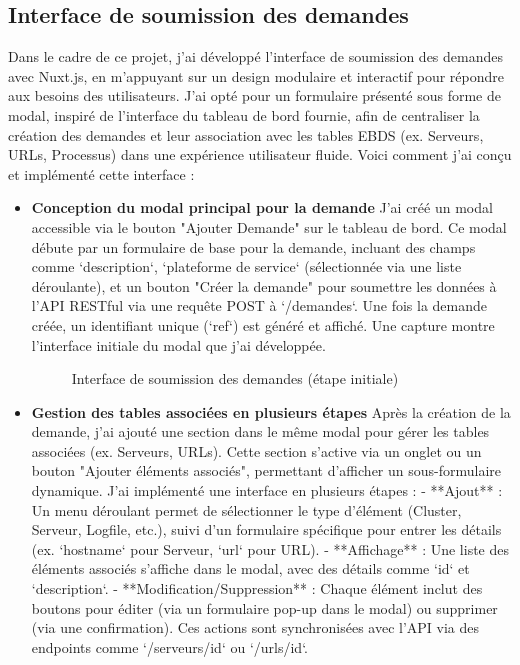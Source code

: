 \subsection{Interface de soumission des demandes}

Dans le cadre de ce projet, j’ai développé l’interface de soumission des demandes avec Nuxt.js, en m’appuyant sur un design modulaire et interactif pour répondre aux besoins des utilisateurs. J’ai opté pour un formulaire présenté sous forme de modal, inspiré de l’interface du tableau de bord fournie, afin de centraliser la création des demandes et leur association avec les tables EBDS (ex. Serveurs, URLs, Processus) dans une expérience utilisateur fluide. Voici comment j’ai conçu et implémenté cette interface :

\begin{itemize}
    \item \textbf{Conception du modal principal pour la demande}  
      J’ai créé un modal accessible via le bouton "Ajouter Demande" sur le tableau de bord. Ce modal débute par un formulaire de base pour la demande, incluant des champs comme `description`, `plateforme de service` (sélectionnée via une liste déroulante), et un bouton "Créer la demande" pour soumettre les données à l’API RESTful via une requête POST à `/demandes`. Une fois la demande créée, un identifiant unique (`ref`) est généré et affiché. Une capture montre l’interface initiale du modal que j’ai développée.
      
      \begin{figure}[h]
          \centering
          \caption{Interface de soumission des demandes (étape initiale)}
          \label{fig:submission_ui_initial}
      \end{figure}
      
    \item \textbf{Gestion des tables associées en plusieurs étapes}  
      Après la création de la demande, j’ai ajouté une section dans le même modal pour gérer les tables associées (ex. Serveurs, URLs). Cette section s’active via un onglet ou un bouton "Ajouter éléments associés", permettant d’afficher un sous-formulaire dynamique. J’ai implémenté une interface en plusieurs étapes :  
      - **Ajout** : Un menu déroulant permet de sélectionner le type d’élément (Cluster, Serveur, Logfile, etc.), suivi d’un formulaire spécifique pour entrer les détails (ex. `hostname` pour Serveur, `url` pour URL).  
      - **Affichage** : Une liste des éléments associés s’affiche dans le modal, avec des détails comme `id` et `description`.  
      - **Modification/Suppression** : Chaque élément inclut des boutons pour éditer (via un formulaire pop-up dans le modal) ou supprimer (via une confirmation). Ces actions sont synchronisées avec l’API via des endpoints comme `/serveurs/{id}` ou `/urls/{id}`.
      

\end{itemize}
